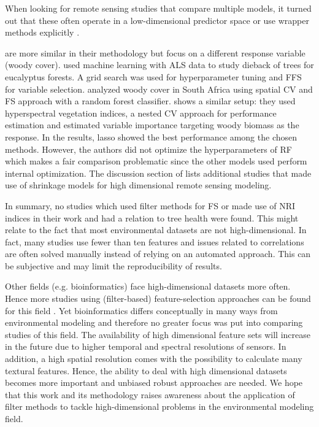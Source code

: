 \documentclass[journal]{IEEEtran}
\begin{document}
When looking for remote sensing studies that compare multiple models, it turned out that these often operate in a low-dimensional predictor space \cite{xu2019} or use wrapper methods explicitly \cite{georganos2018}.

\cite{shendryk2016, ludwig2019} are more similar in their methodology but focus on a different response variable (woody cover).
\cite{shendryk2016} used machine learning with \ac{ALS} data to study dieback of trees for eucalyptus forests.
A grid search was used for hyperparameter tuning and \ac{FFS} for variable selection.
\cite{ludwig2019} analyzed woody cover in South Africa using spatial \ac{CV} and \ac{FS} approach \cite{meyer2018} with a random forest classifier.
\cite{zandler2015} shows a similar setup: they used hyperspectral vegetation indices, a nested CV approach for performance estimation and estimated variable importance targeting woody biomass as the response.
In the results, lasso showed the best performance among the chosen methods.
However, the authors did not optimize the hyperparameters of RF which makes a fair comparison problematic since the other models used perform internal optimization.
The discussion section of \cite{zandler2015} lists additional studies that made use of shrinkage models for high dimensional remote sensing modeling.

In summary, no studies which used filter methods for \ac{FS} or made use of \ac{NRI} indices in their work and had a relation to tree health were found.
This might relate to the fact that most environmental datasets are not high-dimensional.
In fact, many studies use fewer than ten features and issues related to correlations are often solved manually instead of relying on an automated approach.
This can be subjective and may limit the reproducibility of results.

Other fields (e.g. bioinformatics) face high-dimensional datasets more often.
Hence more studies using (filter-based) feature-selection approaches can be found for this field \cite{guo2019, radovic2017}.
Yet bioinformatics differs conceptually in many ways from environmental modeling and therefore no greater focus was put into comparing studies of this field.
The availability of high dimensional feature sets will increase in the future due to higher temporal and spectral resolutions of sensors.
In addition, a high spatial resolution comes with the possibility to calculate many textural features.
Hence, the ability to deal with high dimensional datasets becomes more important and unbiased robust approaches are needed.
We hope that this work and its methodology raises awareness about the application of filter methods to tackle high-dimensional problems in the environmental modeling field.
\end{document}
